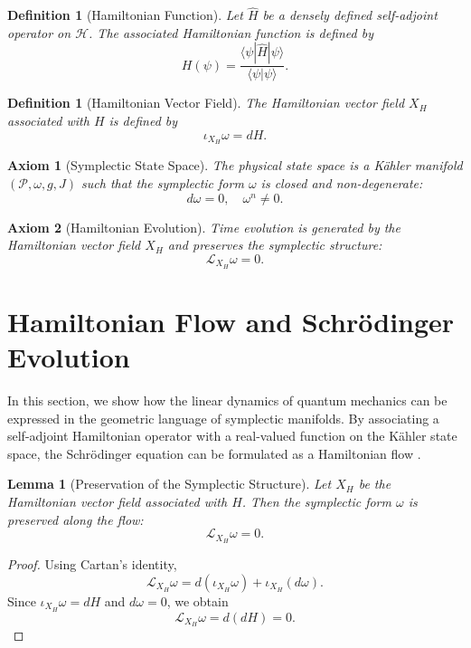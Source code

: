 \documentclass[11pt, a4paper]{article}
\newtheorem{lemma}[theorem]{Lemma}
\newtheorem{definition}[theorem]{Definition}
\newtheorem{axiom}{Axiom}
\begin{document}
\begin{definition}[Hamiltonian Function]
Let $\hat{H}$ be a densely defined self-adjoint operator on $\mathcal{H}$.
The associated Hamiltonian function is defined by
\[
H(\psi) = \frac{\langle \psi | \hat{H} | \psi \rangle}
{\langle \psi | \psi \rangle}.
\]
\end{definition}

\begin{definition}[Hamiltonian Vector Field]
The Hamiltonian vector field $X_H$ associated with $H$ is defined by
\[
\iota_{X_H} \omega = dH.
\]
\end{definition}

\begin{axiom}[Symplectic State Space]
The physical state space is a K\"ahler manifold $(\mathcal{P}, \omega, g, J)$
such that the symplectic form $\omega$ is closed and non-degenerate:
\[
d\omega = 0, \quad \omega^n \neq 0.
\]
\end{axiom}

\begin{axiom}[Hamiltonian Evolution]
Time evolution is generated by the Hamiltonian vector field $X_H$ and
preserves the symplectic structure:
\[
\mathcal{L}_{X_H} \omega = 0.
\]
\end{axiom}






\section{Hamiltonian Flow and Schr\"odinger Evolution}

In this section, we show how the linear dynamics of quantum mechanics
can be expressed in the geometric language of symplectic manifolds.
By associating a self-adjoint Hamiltonian operator with a real-valued
function on the K\"ahler state space, the Schr\"odinger equation can be
formulated as a Hamiltonian flow \cite{kibble1979,anandan1990,heydari2015}.

\begin{lemma}[Preservation of the Symplectic Structure]
Let $X_H$ be the Hamiltonian vector field associated with $H$.
Then the symplectic form $\omega$ is preserved along the flow:
\[
\mathcal{L}_{X_H} \omega = 0.
\]
\end{lemma}

\begin{proof}
Using Cartan's identity,
\[
\mathcal{L}_{X_H} \omega = d(\iota_{X_H} \omega) + \iota_{X_H}(d\omega).
\]
Since $\iota_{X_H} \omega = dH$ and $d\omega = 0$, we obtain
\[
\mathcal{L}_{X_H} \omega = d(dH) = 0.
\]
\end{proof}
\end{document}
